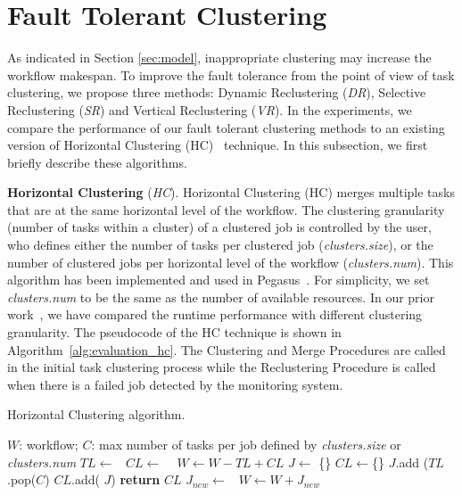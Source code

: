 \documentclass{IOS-Book-Article}
\begin{document}
\section{Fault Tolerant Clustering}
\label{sec:clustering}

As indicated in Section \ref{sec:model}, inappropriate clustering may increase the workflow makespan. To improve the fault tolerance from the point of view of task clustering, we propose three methods: Dynamic Reclustering (\emph{DR}), Selective Reclustering (\emph{SR}) and Vertical Reclustering (\emph{VR}). In the experiments, we compare the performance of our fault tolerant clustering methods to an existing version of Horizontal Clustering (HC)~\cite{Singh2008} technique. In this subsection, we first briefly describe these algorithms.

\textbf{Horizontal Clustering} (\emph{HC}). 
Horizontal Clustering (HC) merges multiple tasks that are at the same horizontal level of the workflow. The clustering granularity (number of tasks within a cluster) of a clustered job is controlled by the user, who defines either the number of tasks per clustered job (\emph{clusters.size}), or the number of clustered jobs per horizontal level of the workflow (\emph{clusters.num}). This algorithm has been implemented and used in Pegasus~\cite{Singh2008}. For simplicity, we set \emph{clusters.num} to be the same as the number of available resources. In our prior work~\cite{Chen2013a,Chen2013b}, we have compared the runtime performance with different clustering granularity. The pseudocode of the HC technique is shown in Algorithm~\ref{alg:evaluation_hc}. The Clustering and Merge Procedures are called in the initial task clustering process while the Reclustering Procedure is called when there is a failed job detected by the monitoring system. 

\begin{algorithm}[!htb]
	\footnotesize
	\caption{Horizontal Clustering algorithm.}
	\label{alg:evaluation_hc}
	\begin{algorithmic}[1]
		\Require $W$: workflow; $C$: max number of tasks per job defined by \emph{clusters.size} or \emph{clusters.num}
				\State $TL\gets $\  
				\State $CL\gets$  \  
				\State $W \gets W - TL + CL$   
			\EndFor
		\EndProcedure
			\State $J\gets$ \{\}
			\State $CL\gets$\{\}
				\State $J$.add ($TL$.pop($C$) 
				\State  $CL$.add( $J$)
			\EndWhile
			\State \textbf{return} $CL$
		\EndProcedure
			\State $J_{new}\gets$\  
			\State $W \gets W + J_{new}$ 
		\EndProcedure
	\end{algorithmic}
\end{algorithm}
\end{document}
